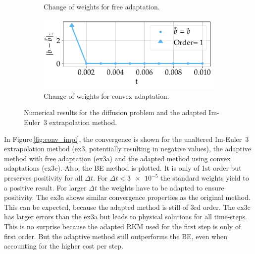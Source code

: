 \documentclass[a4paper]{article}
\numberwithin{equation}{section}
\theoremstyle{plain}
\theoremstyle{definition}
\numberwithin{theorem}{section}
\newcommand{\dt}{{\Delta t}}
\newcommand{\1}{\mathbbm{1}}
\begin{document}
\begin{figure}
\begin{subfigure}[b]{0.45\textwidth}
\caption{Change of weights for free adaptation.}
\label{fig:weights_Diff_a}
\end{subfigure}
\begin{subfigure}[b]{0.45\textwidth}
\centering
\includegraphics[width=1\textwidth]{plots/b_Diff_Convex.pdf}
\caption{Change of weights for convex adaptation.}
\label{fig:weights_Diff_c}
\end{subfigure}
\caption{Numerical results for the diffusion problem and the
         adapted Im-Euler~3 extrapolation method.}
\end{figure}


In Figure\,\ref{fig:conv_impl}, the convergence is shown for the unaltered Im-Euler~3 extrapolation method (ex3, potentially resulting in negative values), the adaptive method with free adaptation (ex3a) and the adapted method using convex adaptations (ex3c).
Also, the BE method is plotted. It is only of 1st order but preserves positivity for all $\dt$. 
For $\dt < \num{3e-5} $ the standard weights yield to a positive result. For larger $\dt$ the weights have to be adapted to ensure positivity. 
The ex3a shows similar convergence properties as the original method.
This can be expected, because the adapted method is still of 3rd order. 
The ex3c has larger errors than the ex3a but leads to physical solutions for all time-steps.
This is no surprise because the adapted RKM used for the first step is only of first order.
But the adaptive method still outperforms the BE, even when accounting for the higher cost per step. 
\end{document}
